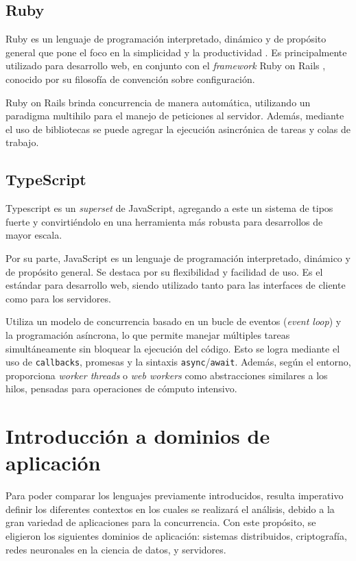 \documentclass[11pt]{article}
\let\Oldsection\section
\renewcommand{\section}{\FloatBarrier\Oldsection}
\let\Oldsubsection\subsection
\renewcommand{\subsection}{\FloatBarrier\Oldsubsection}
\newcommand{\english}[1]{\textit{#1}}
\begin{document}
\subsection{Ruby}

Ruby es un lenguaje de programación interpretado, dinámico y de propósito general que pone el foco en la simplicidad y la productividad \cite{com:ruby}. Es principalmente utilizado para desarrollo web, en conjunto con el \english{framework} Ruby on Rails \cite{http:ruby:ruby-on-rails}, conocido por su filosofía de convención sobre configuración.

Ruby on Rails brinda concurrencia de manera automática, utilizando un paradigma multihilo para el manejo de peticiones al servidor. Además, mediante el uso de bibliotecas se puede agregar la ejecución asincrónica de tareas y colas de trabajo.

\subsection{TypeScript}

Typescript \cite{js:lib:typescript} es un \english{superset} de JavaScript, agregando a este un sistema de tipos fuerte y convirtiéndolo en una herramienta más robusta para desarrollos de mayor escala.

Por su parte, JavaScript es un lenguaje de programación interpretado, dinámico y de propósito general. Se destaca por su flexibilidad y facilidad de uso. Es el estándar para desarrollo web, siendo utilizado tanto para las interfaces de cliente como para los servidores.

Utiliza un modelo de concurrencia basado en un bucle de eventos (\english{event loop}) y la programación asíncrona, lo que permite manejar múltiples tareas simultáneamente sin bloquear la ejecución del código. Esto se logra mediante el uso de \lstinline{callbacks}, promesas y la sintaxis \lstinline{async}/\lstinline{await}. Además, según el entorno, proporciona \english{worker threads} o \english{web workers} como abstracciones similares a los hilos, pensadas para operaciones de cómputo intensivo.

\newpage

\section{Introducción a dominios de aplicación}

Para poder comparar los lenguajes previamente introducidos, resulta imperativo definir los diferentes contextos en los cuales se realizará el análisis, debido a la gran variedad de aplicaciones para la concurrencia. Con este propósito, se eligieron los siguientes dominios de aplicación: sistemas distribuidos, criptografía, redes neuronales en la ciencia de datos, y servidores.
\end{document}

